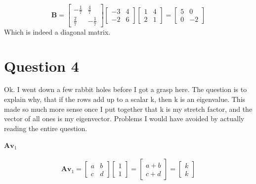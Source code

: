 \documentclass{article}
\begin{document}
                    \[
                        \mathbf{B}
                        =
                        \begin{bmatrix}-\frac{1}{7} & \frac{4}{7}\\\frac{2}{7} & -\frac{1}{7}\end{bmatrix}
                        \begin{bmatrix}-3 & 4\\-2 & 6\end{bmatrix}
                        \begin{bmatrix}1 & 4\\2 & 1\end{bmatrix}
                        =
                        \begin{bmatrix}5 & 0\\0 & -2\end{bmatrix}
                    \]
                    Which is indeed a diagonal matrix.
    \section{Question 4}
        Ok. I went down a few rabbit holes before I got a grasp here.
        The question is to explain why, that if the rows add up to a scalar k,
        then k is an eigenvalue. This made so much more sense once I put together that
        k is my stretch factor, and the vector of all ones is my eigenvector.
        Problems I would have avoided by actually reading the entire question.
        \paragraph{$\mathbf{A}\mathbf{v}_1$}
            \[
                \mathbf{A}\mathbf{v}_1
                =
                \begin{bmatrix}
                    a & b\\
                    c & d
                \end{bmatrix}
                \begin{bmatrix}
                    1\\1
                \end{bmatrix}
                =
                \begin{bmatrix}
                    a+b\\
                    c+d
                \end{bmatrix}
                =
                \begin{bmatrix}
                    k\\
                    k
                \end{bmatrix}
            \]
\end{document}
